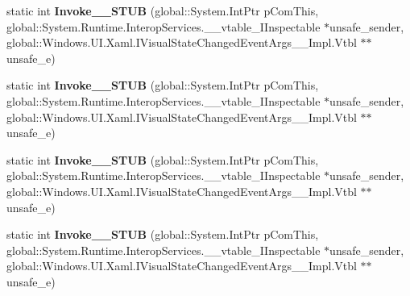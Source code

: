 \begin{DoxyCompactItemize}
\item 
\mbox{\label{struct_windows_1_1_u_i_1_1_xaml_1_1_visual_state_changed_event_handler_____impl_1_1_vtbl_a887532d06ced4e54c6c49a357110b3d8}} 
static int {\bfseries Invoke\+\_\+\+\_\+\+S\+T\+UB} (global\+::\+System.\+Int\+Ptr p\+Com\+This, global\+::\+System.\+Runtime.\+Interop\+Services.\+\_\+\+\_\+vtable\+\_\+\+I\+Inspectable $\ast$unsafe\+\_\+sender, global\+::\+Windows.\+U\+I.\+Xaml.\+I\+Visual\+State\+Changed\+Event\+Args\+\_\+\+\_\+\+Impl.\+Vtbl $\ast$$\ast$unsafe\+\_\+e)
\item 
\mbox{\label{struct_windows_1_1_u_i_1_1_xaml_1_1_visual_state_changed_event_handler_____impl_1_1_vtbl_a887532d06ced4e54c6c49a357110b3d8}} 
static int {\bfseries Invoke\+\_\+\+\_\+\+S\+T\+UB} (global\+::\+System.\+Int\+Ptr p\+Com\+This, global\+::\+System.\+Runtime.\+Interop\+Services.\+\_\+\+\_\+vtable\+\_\+\+I\+Inspectable $\ast$unsafe\+\_\+sender, global\+::\+Windows.\+U\+I.\+Xaml.\+I\+Visual\+State\+Changed\+Event\+Args\+\_\+\+\_\+\+Impl.\+Vtbl $\ast$$\ast$unsafe\+\_\+e)
\item 
\mbox{\label{struct_windows_1_1_u_i_1_1_xaml_1_1_visual_state_changed_event_handler_____impl_1_1_vtbl_a887532d06ced4e54c6c49a357110b3d8}} 
static int {\bfseries Invoke\+\_\+\+\_\+\+S\+T\+UB} (global\+::\+System.\+Int\+Ptr p\+Com\+This, global\+::\+System.\+Runtime.\+Interop\+Services.\+\_\+\+\_\+vtable\+\_\+\+I\+Inspectable $\ast$unsafe\+\_\+sender, global\+::\+Windows.\+U\+I.\+Xaml.\+I\+Visual\+State\+Changed\+Event\+Args\+\_\+\+\_\+\+Impl.\+Vtbl $\ast$$\ast$unsafe\+\_\+e)
\item 
\mbox{\label{struct_windows_1_1_u_i_1_1_xaml_1_1_visual_state_changed_event_handler_____impl_1_1_vtbl_a887532d06ced4e54c6c49a357110b3d8}} 
static int {\bfseries Invoke\+\_\+\+\_\+\+S\+T\+UB} (global\+::\+System.\+Int\+Ptr p\+Com\+This, global\+::\+System.\+Runtime.\+Interop\+Services.\+\_\+\+\_\+vtable\+\_\+\+I\+Inspectable $\ast$unsafe\+\_\+sender, global\+::\+Windows.\+U\+I.\+Xaml.\+I\+Visual\+State\+Changed\+Event\+Args\+\_\+\+\_\+\+Impl.\+Vtbl $\ast$$\ast$unsafe\+\_\+e)

\end{DoxyCompactItemize}

